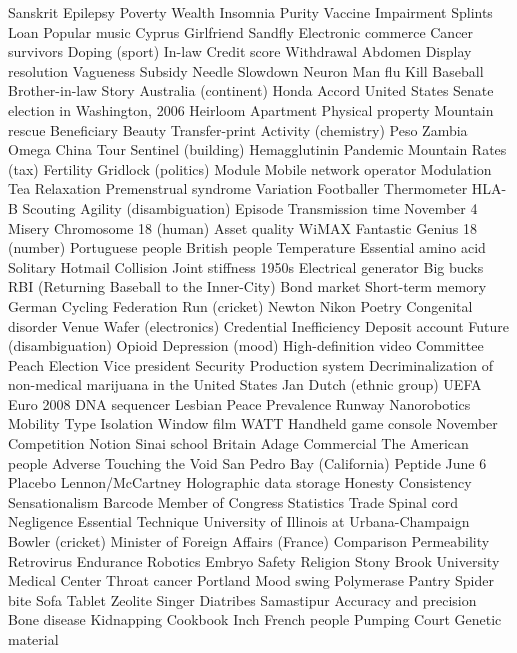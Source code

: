 Sanskrit  Epilepsy  Poverty  
Wealth  Insomnia  Purity  
Vaccine  Impairment  Splints  
Loan  Popular music  Cyprus  
Girlfriend  Sandfly  Electronic commerce  
Cancer survivors  Doping (sport)  In-law  
Credit score  Withdrawal  Abdomen  
Display resolution  Vagueness  Subsidy  
Needle  Slowdown  Neuron  
Man flu  Kill  Baseball  
Brother-in-law  Story  Australia (continent)  
Honda Accord  United States Senate election in Washington, 2006  Heirloom  
Apartment  Physical property  Mountain rescue  
Beneficiary  Beauty  Transfer-print  
Activity (chemistry)  Peso  Zambia  
Omega China Tour  Sentinel (building)  Hemagglutinin  
Pandemic  Mountain  Rates (tax)  
Fertility  Gridlock (politics)  Module  
Mobile network operator  Modulation  Tea  
Relaxation  Premenstrual syndrome  Variation  
Footballer  Thermometer  HLA-B  
Scouting  Agility (disambiguation)  Episode  
Transmission time  November 4  Misery  
Chromosome 18 (human)  Asset quality  WiMAX  
Fantastic  Genius  18 (number)  
Portuguese people  British people  Temperature  
Essential amino acid  Solitary  Hotmail  
Collision  Joint stiffness  1950s  
Electrical generator  Big bucks  RBI (Returning Baseball to the Inner-City)  
Bond market  Short-term memory  German Cycling Federation  
Run (cricket)  Newton  Nikon  
Poetry  Congenital disorder  Venue  
Wafer (electronics)  Credential  Inefficiency  
Deposit account  Future (disambiguation)  Opioid  
Depression (mood)  High-definition video  Committee  
Peach  Election  Vice president  
Security  Production system  Decriminalization of non-medical marijuana in the United States  
Jan  Dutch (ethnic group)  UEFA Euro 2008  
DNA sequencer  Lesbian  Peace  
Prevalence  Runway  Nanorobotics  
Mobility  Type  Isolation  
Window film  WATT  Handheld game console  
November  Competition  Notion  
Sinai school  Britain  Adage  
Commercial  The American people  Adverse  
Touching the Void  San Pedro Bay (California)  Peptide  
June 6  Placebo  Lennon/McCartney  
Holographic data storage  Honesty  Consistency  
Sensationalism  Barcode  Member of Congress  
Statistics  Trade  Spinal cord  
Negligence  Essential  Technique  
University of Illinois at Urbana-Champaign  Bowler (cricket)  Minister of Foreign Affairs (France)  
Comparison  Permeability  Retrovirus  
Endurance  Robotics  Embryo  
Safety  Religion  Stony Brook University Medical Center  
Throat cancer  Portland  Mood swing  
Polymerase  Pantry  Spider bite  
Sofa  Tablet  Zeolite  
Singer  Diatribes  Samastipur  
Accuracy and precision  Bone disease  Kidnapping  
Cookbook  Inch  French people  
Pumping  Court  Genetic material  
